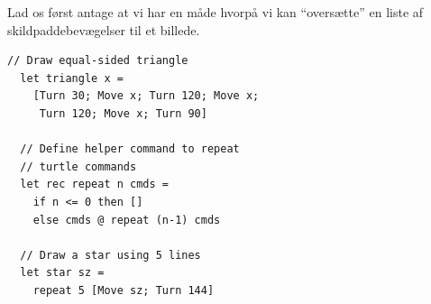 \documentclass[rgb]{beamer}
\begin{document}
\begin{frame}[fragile]
\begin{footnotesize}

  \vspace{1ex}

  Lad os først antage at vi har en måde hvorpå vi kan ``oversætte''
  en liste af skildpaddebevægelser til et billede.

  \vspace{1ex}

\begin{minipage}[b]{0.7\textwidth}

  \vspace{1ex}
\begin{lstlisting}[numbers=none,frame=none,mathescape]
  // Draw equal-sided triangle
  let triangle x =
    [Turn 30; Move x; Turn 120; Move x;
     Turn 120; Move x; Turn 90]

  // Define helper command to repeat
  // turtle commands
  let rec repeat n cmds =
    if n <= 0 then []
    else cmds @ repeat (n-1) cmds

  // Draw a star using 5 lines
  let star sz =
    repeat 5 [Move sz; Turn 144]
\end{lstlisting}
\end{minipage} \hspace{5mm}
\begin{minipage}[b]{0.2\textwidth}


\end{minipage}
\end{footnotesize}
\end{frame}
\end{document}
